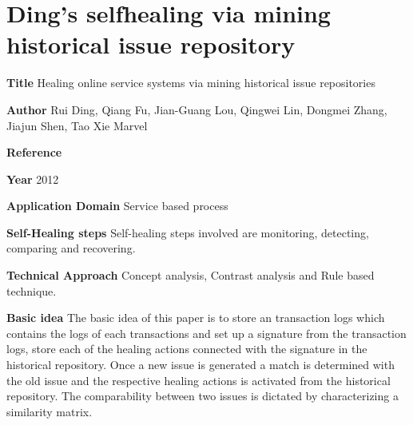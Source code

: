 \section{Ding's selfhealing via mining historical issue repository}\label{DingSelf}
\begin{compactitem}
\item[\textbf{Title}] Healing online service systems via mining historical issue repositories
\item[\textbf{Author}]
Rui Ding, Qiang Fu, Jian-Guang Lou, Qingwei Lin, Dongmei Zhang, Jiajun Shen, Tao Xie
Marvel\item[\textbf{Reference}] 

\cite{ding_healing:_2012}

\item[\textbf{Year}] 2012

\item[\textbf{Application Domain}]
Service based process

\item[\textbf{Self-Healing steps}] Self-healing steps involved are monitoring, detecting, comparing and recovering.

\item[\textbf{Technical Approach}] Concept analysis,  Contrast analysis and Rule based technique.

\item[\textbf{Basic idea}] The basic idea of this paper is to store an transaction logs which contains the logs of each transactions and set up a signature from the transaction logs, store each of the healing actions connected with the signature in the historical repository. Once a new issue is generated a match is determined with the old issue and the respective healing actions is activated from the historical repository. The comparability between two issues is dictated by characterizing a similarity matrix.


\end{compactitem}

